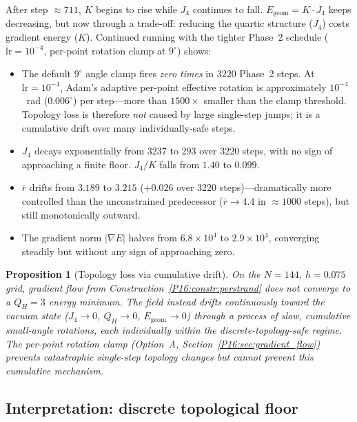 \documentclass[11pt,a4paper]{article}
\newtheorem{proposition}[theorem]{Proposition}
\theoremstyle{definition}\newtheorem{definition}[theorem]{Definition}
\theoremstyle{remark}
\theoremstyle{definition}\newtheorem{construction}[theorem]{Construction}
\newcommand{\QH}{Q_H}
\begin{document}
After step $\approx711$, $K$ begins to rise while $J_4$ continues
to fall.  $E_{\mathrm{geom}}=K\!\cdot\!J_4$ keeps decreasing, but now
through a trade-off: reducing the quartic structure ($J_4$) costs
gradient energy ($K$).  Continued running with the tighter
Phase~2 schedule ($\mathrm{lr}=10^{-4}$, per-point rotation clamp at
$9^\circ$) shows:

\begin{itemize}
\item The default $9^\circ$ angle clamp fires \emph{zero times} in $3220$
Phase~2 steps.  At $\mathrm{lr}=10^{-4}$, Adam's adaptive per-point
effective rotation is approximately $10^{-4}$~rad ($0.006^\circ$) per
step---more than $1500\times$ smaller than the clamp threshold.
Topology loss is therefore \emph{not} caused by large single-step
jumps; it is a cumulative drift over many individually-safe steps.

\item $J_4$ decays exponentially from $3237$ to $293$ over $3220$
steps, with no sign of approaching a finite floor.  $J_4/K$ falls
from $1.40$ to $0.099$.

\item $\bar r$ drifts from $3.189$ to $3.215$ ($+0.026$ over 3220
steps)---dramatically more controlled than the unconstrained
predecessor ($\bar r\to4.4$ in $\approx1000$ steps), but still
monotonically outward.

\item The gradient norm $|\nabla E|$ halves from $6.8\times10^4$ to
$2.9\times10^4$, converging steadily but without any sign of
approaching zero.
\end{itemize}

\begin{proposition}[Topology loss via cumulative drift]
\label{P16:prop:gf_topology_loss}
On the $N=144$, $h=0.075$ grid, gradient flow from
Construction~\ref{P16:constr:perstrand} does not converge to a
$\QH=3$ energy minimum.  The field instead drifts continuously toward
the vacuum state ($J_4\to0$, $\QH\to0$, $E_{\mathrm{geom}}\to0$) through
a process of slow, cumulative small-angle rotations, each individually
within the discrete-topology-safe regime.  The per-point rotation clamp
(Option~A, Section~\ref{P16:sec:gradient_flow}) prevents catastrophic
single-step topology changes but cannot prevent this cumulative
mechanism.
\end{proposition}

\subsection{Interpretation: discrete topological floor}
\label{P16:sec:gf_floor}
\end{document}
